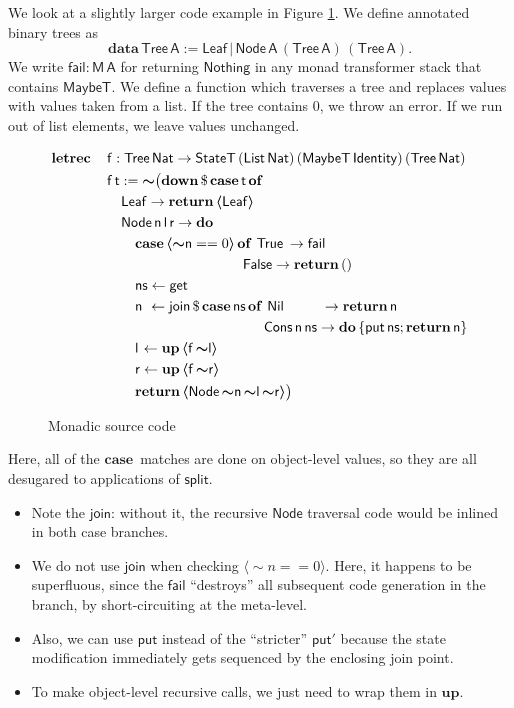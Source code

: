 \documentclass[acmsmall]{acmart}
\newcommand{\mit}[1]{{\mathsf{#1}}}
\newcommand{\msf}[1]{{\mathsf{#1}}}
\newcommand{\mbf}[1]{{\mathbf{#1}}}
\newcommand{\bs}[1]{\boldsymbol{#1}}
\newcommand{\mdo}{\mbf{do}\,}
\newcommand{\ind}{\hspace{1em}}
\newcommand{\return}{\mbf{return}\,}
\newcommand{\data}{\mbf{data}\,}
\newcommand{\letrec}{\mbf{letrec}\,}
\newcommand{\of}{\mbf{of}\,}
\newcommand{\vn}{\mathsf{n}}
\newcommand{\vA}{\mathsf{A}}
\newcommand{\vf}{\mathsf{f}}
\newcommand{\vt}{\mathsf{t}}
\newcommand{\vr}{\mathsf{r}}
\newcommand{\vl}{\mathsf{l}}
\newcommand{\vns}{\mathsf{ns}}
\newcommand{\List}{\msf{List}}
\newcommand{\Tree}{\msf{Tree}}
\newcommand{\Node}{\msf{Node}}
\newcommand{\Leaf}{\msf{Leaf}}
\newcommand{\Nil}{\msf{Nil}}
\newcommand{\Cons}{\msf{Cons}}
\newcommand{\fro}{\leftarrow}
\newcommand{\case}{\mbf{case\,}}
\newcommand{\spl}{{\bs{\sim}}}
\newcommand{\ql}{{\bs{\langle}}}
\newcommand{\qr}{{\bs{\rangle}}}
\newcommand{\True}{\msf{True}}
\newcommand{\False}{\msf{False}}
\newcommand{\Nat}{\msf{Nat}}
\newcommand{\MaybeT}{\msf{MaybeT}}
\newcommand{\Nothing}{\msf{Nothing}}
\theoremstyle{remark}
\newcommand{\mup}{\mbf{up}}
\newcommand{\mdown}{\mbf{down}}
\newcommand{\qt}[1]{\ql#1\qr}
\newcommand{\StateT}{\msf{StateT}}
\newcommand{\Identity}{\msf{Identity}}
\newcommand{\dlr}{\,\$\,}
\newcommand{\join}{\mit{join}}
\newcommand{\get}{\mit{get}}
\begin{document}
We look at a slightly larger code example in Figure \ref{fig:codeinp}. We define
annotated binary trees as
\[ \data \Tree\,\vA := \Leaf\,|\,\Node\,\vA\,(\Tree\,\vA)\,(\Tree\,\vA). \]
We write $\msf{fail : M\,A}$ for returning $\Nothing$ in any monad transformer
stack that contains $\MaybeT$. We define a function which traverses a tree and
replaces values with values taken from a list. If the tree contains $0$, we
throw an error. If we run out of list elements, we leave values unchanged.
\begin{figure}
\begin{alignat*}{4}
  &  \letrec &&\vf : \Tree\,\Nat \to \StateT\,(\List\,\Nat)\,(\MaybeT\,\Identity)\,(\Tree\,\Nat) \\
  &          &&\vf\,\vt := \spl \big(\mdown \dlr \case \vt\,\of\\
  &          &&\ind \Leaf \to \return \qt{\Leaf} \\
  &          &&\ind \Node\,\vn\,\vl\,\vr \to \mdo\\
  &          &&\ind \ind \case \qt{\spl \vn == 0}\,\of\,\True \hspace{0.2em}\to \msf{fail}\\
  &          &&\ind \ind \ind \hspace{6.7em}             \False \to \return () \\
  &          &&\ind \ind \vns \fro \get \\
  &          &&\ind \ind \vn\hspace{0.35em}\fro\join \dlr \case \vns\,\of\,\Nil \hspace{2.65em}\to \return \vn \\
  &          &&\ind \ind \ind \hspace{8.2em}\Cons\,\vn\,\vns \to \mdo \{\msf{put}\,\vns; \return \vn\} \\
  &          &&\ind \ind \vl\hspace{0.1em} \fro \mup\,\qt{\vf\,\spl \vl} \\
  &          &&\ind \ind \vr \fro \mup\,\qt{\vf\,\spl \vr} \\
  &          &&\ind \ind \return \qt{\Node\,\spl \vn\,\spl \vl\,\spl \vr}\big)
\end{alignat*}
\caption{Monadic source code}
\label{fig:codeinp}
\end{figure}
Here, all of the $\case$ matches are done on object-level values, so they are
all desugared to applications of $\msf{split}$.
\begin{itemize}
\item Note the $\join$: without it, the recursive $\Node$ traversal code would be inlined in both case branches.
\item We do not use $\join$ when checking $\qt{\spl n == 0}$. Here, it
      happens to be superfluous, since the $\msf{fail}$ ``destroys'' all subsequent
      code generation in the branch, by short-circuiting at the meta-level.
\item Also, we can use $\msf{put}$ instead of the ``stricter'' $\msf{put'}$ because
      the state modification immediately gets sequenced by the enclosing join point.
\item To make object-level recursive calls, we just need to wrap them in $\mup$.
\end{itemize}
\end{document}
